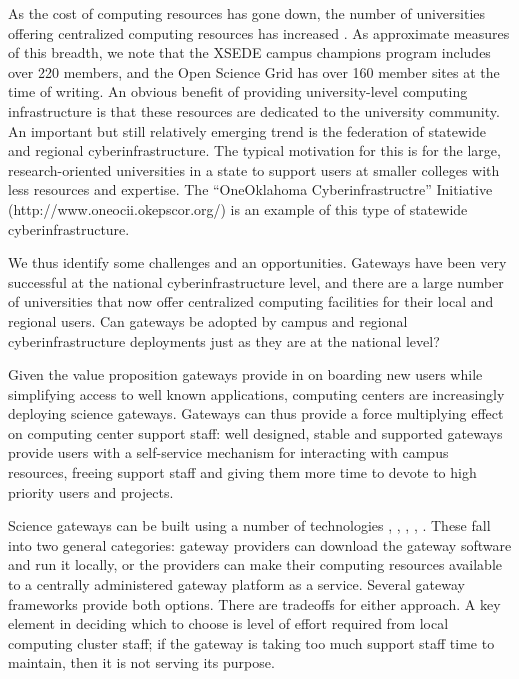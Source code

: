 \documentclass[sigconf]{acmart}
\begin{document}
As the cost of computing resources has gone down, the number of universities offering centralized computing resources has increased \cite{hacker2007making}. As approximate measures of this breadth, we note that the XSEDE campus champions program includes over 220 members, and the Open Science Grid has over 160 member sites at the time of writing. An obvious benefit of providing university-level computing infrastructure is that these resources are dedicated to the university community. An important but still relatively emerging trend is the federation of statewide and regional cyberinfrastructure. The typical motivation for this is for the large, research-oriented universities in a state to support users at smaller colleges with less resources and expertise. The ``OneOklahoma Cyberinfrastructre'' Initiative (http://www.oneocii.okepscor.org/) is an example of this type of statewide cyberinfrastructure.

We thus identify some challenges and an opportunities. Gateways have been very successful at the national cyberinfrastructure level, and there are a large number of universities that now offer centralized computing facilities for their local and regional users. Can gateways be adopted by campus and regional cyberinfrastructure deployments just as they are at the national level?

Given the value proposition gateways provide in on boarding new users while simplifying access to well known applications, computing centers are increasingly deploying science gateways.  Gateways can thus provide a force multiplying effect on computing center support staff: well designed, stable and supported gateways provide users with a self-service mechanism for interacting with campus resources, freeing support staff and giving them more time to devote to high priority users and projects.

Science gateways can be built using a number of technologies \cite{mclennan2010hubzero}, \cite{dooley2012software}, \cite{marru2011apache}, \cite{goecks2010galaxy}, \cite{kluyver2016jupyter}.  These fall into two general categories: gateway providers can download the gateway software and run it locally, or the providers can make their computing resources available to a centrally administered gateway platform as a service. Several gateway frameworks provide both options.  There are tradeoffs for either approach. A key element in deciding which to choose is level of effort required from local computing cluster staff; if the gateway is taking too much support staff time to maintain, then it is not serving its purpose.
\end{document}

